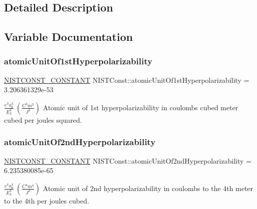 \subsection{Detailed Description}


\subsection{Variable Documentation}
\mbox{\label{group___n_i_s_t_const-_atomic_unit_gaa8a2a7516740737167afdeb3cd4ee584}} 
\subsubsection{\texorpdfstring{atomic\+Unit\+Of1st\+Hyperpolarizability}{atomicUnitOf1stHyperpolarizability}}
{\footnotesize\ttfamily \mbox{\hyperlink{_n_i_s_t_const_8hpp_a2b0fc1d7452373f816175dd86ce26729}{N\+I\+S\+T\+C\+O\+N\+S\+T\+\_\+\+C\+O\+N\+S\+T\+A\+NT}} N\+I\+S\+T\+Const\+::atomic\+Unit\+Of1st\+Hyperpolarizability = 3.\+206361329e-\/53}

$\frac{e^3 a_0^3}{E_h^2} \ (\frac{C^3 m^3}{J^2})$ Atomic unit of 1st hyperpolarizability in coulombs cubed meter cubed per joules squared. \mbox{\label{group___n_i_s_t_const-_atomic_unit_gabcc03469254baef16a69abd058ae5ada}} 
\subsubsection{\texorpdfstring{atomic\+Unit\+Of2nd\+Hyperpolarizability}{atomicUnitOf2ndHyperpolarizability}}
{\footnotesize\ttfamily \mbox{\hyperlink{_n_i_s_t_const_8hpp_a2b0fc1d7452373f816175dd86ce26729}{N\+I\+S\+T\+C\+O\+N\+S\+T\+\_\+\+C\+O\+N\+S\+T\+A\+NT}} N\+I\+S\+T\+Const\+::atomic\+Unit\+Of2nd\+Hyperpolarizability = 6.\+235380085e-\/65}

$\frac{e^4 a_0^4}{E_h^3} \ (\frac{C^4 m^4}{J^3})$ Atomic unit of 2nd hyperpolarizability in coulombs to the 4th meter to the 4th per joules cubed. \mbox{\label{group___n_i_s_t_const-_atomic_unit_ga7f1326edcbb03c0df4c2e81afcea7ac8}} 

